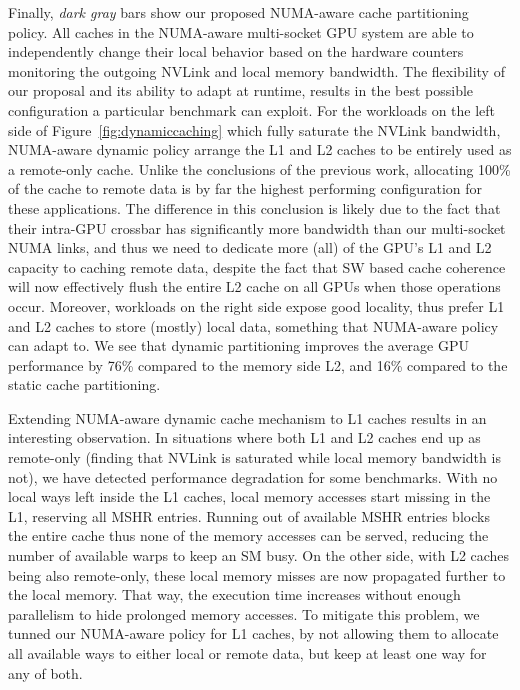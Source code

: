 Finally, \emph{dark gray} bars show our proposed NUMA-aware cache 
partitioning policy. All caches in the NUMA-aware multi-socket GPU system are 
able to independently change their local behavior based on the hardware 
counters monitoring the outgoing NVLink and local memory bandwidth. The 
flexibility of our proposal and its ability to adapt at runtime, results in 
the best possible configuration a particular benchmark can exploit. For the 
workloads on the left side of Figure~\ref{fig:dynamiccaching} which fully 
saturate the NVLink bandwidth, NUMA-aware dynamic policy arrange the L1 and 
L2 caches to be entirely used as a remote-only cache. Unlike the conclusions 
of the previous work, allocating 100\% of the cache to remote data is by far 
the highest performing configuration for these applications. The difference 
in this conclusion is likely due to the fact that their intra-GPU crossbar 
has significantly more bandwidth than our multi-socket NUMA links, and thus 
we need to dedicate more (all) of the GPU's L1 and L2 capacity to caching 
remote data, despite the fact that SW based cache coherence will now 
effectively flush the entire L2 cache on all GPUs when those operations 
occur. Moreover, workloads on the right side expose good locality, thus 
prefer L1 and L2 caches to store (mostly) local data, something that 
NUMA-aware policy can adapt to. We see that dynamic partitioning improves 
the average GPU performance by 76\% compared to the memory side L2, and 16\% 
compared to the static cache partitioning. 

Extending NUMA-aware dynamic cache mechanism to L1 caches results in an 
interesting observation. In situations where both L1 and L2 caches end up as 
remote-only (finding that NVLink is saturated while local memory bandwidth is 
not), we have detected performance degradation for some benchmarks. With no 
local ways left inside the L1 caches, local memory accesses start missing in 
the L1, reserving all MSHR entries. Running out of available MSHR entries 
blocks the entire cache thus none of the memory accesses can be served, 
reducing the number of available warps to keep an SM busy. On the other side, 
with L2 caches being also remote-only, these local memory misses are now 
propagated further to the local memory. That way, the execution time 
increases without enough parallelism to hide prolonged memory accesses. To 
mitigate this problem, we tunned our NUMA-aware policy for L1 caches, by not 
allowing them to allocate all available ways to either local or remote data, 
but keep at least one way for any of both. 

